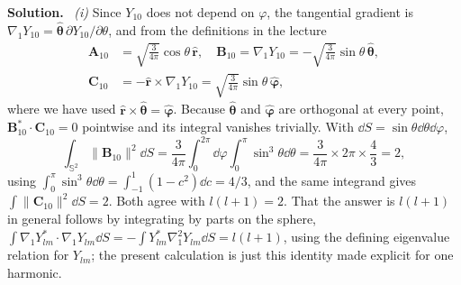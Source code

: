 \documentclass[a4paper,12pt]{paper}
\newenvironment{solution}{\par\noindent\textbf{Solution.}\ }{\par\medskip}
\begin{document}
\begin{solution}
\textit{(i)} Since $Y_{10}$ does not depend on $\varphi$, the tangential gradient is
$\nabla_{1}Y_{10}=\hat{\bm{\theta}}\,\partial Y_{10}/\partial\theta$, and from the definitions
in the lecture
\begin{align}
\mathbf{A}_{10}&=\sqrt{\frac{3}{4\pi}}\cos\theta\,\hat{\mathbf{r}},\quad
\mathbf{B}_{10}=\nabla_{1}Y_{10}=-\sqrt{\frac{3}{4\pi}}\sin\theta\,\hat{\bm{\theta}},\nonumber\\
\mathbf{C}_{10}&=-\hat{\mathbf{r}}\times\nabla_{1}Y_{10}=\sqrt{\frac{3}{4\pi}}\sin\theta\,\hat{\bm{\varphi}},
\label{eq:32}
\end{align}
where we have used $\hat{\mathbf{r}}\times\hat{\bm{\theta}}=\hat{\bm{\varphi}}$. Because
$\hat{\bm{\theta}}$ and $\hat{\bm{\varphi}}$ are orthogonal at every point,
$\mathbf{B}_{10}^{*}\cdot\mathbf{C}_{10}=0$ pointwise and its integral vanishes trivially. With
$\dd S=\sin\theta\dd\theta\dd\varphi$,
\begin{equation}
\int_{\mathbb{S}^{2}}\|\mathbf{B}_{10}\|^{2}\dd S=\frac{3}{4\pi}\int_{0}^{2\pi}\dd\varphi\int_{0}^{\pi}\sin^{3}\theta\dd\theta
=\frac{3}{4\pi}\times2\pi\times\frac{4}{3}=2,
\label{eq:33}
\end{equation}
using $\int_{0}^{\pi}\sin^{3}\theta\dd\theta=\int_{-1}^{1}(1-c^{2})\dd c=4/3$, and the same
integrand gives $\int\|\mathbf{C}_{10}\|^{2}\dd S=2$. Both agree with $l(l+1)=2$. That the
answer is $l(l+1)$ in general follows by integrating by parts on the sphere,
$\int\nabla_{1}Y_{lm}^{*}\cdot\nabla_{1}Y_{lm}\dd S=-\int Y_{lm}^{*}\nabla_{1}^{2}Y_{lm}\dd S=l(l+1)$,
using the defining eigenvalue relation for $Y_{lm}$; the present calculation is just this
identity made explicit for one harmonic.


\end{solution}
\end{document}
